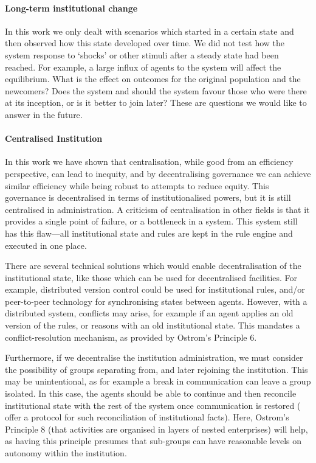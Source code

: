 \paragraph{Long-term institutional change} In this work we only dealt with
scenarios which started in a certain state and then observed how this state
developed over time. We did not test how the system response to `shocks' or
other stimuli after a steady state had been reached. For example, a large
influx of agents to the system will affect the equilibrium. What is the effect
on outcomes for the original population and the newcomers? Does the system and
should the system favour those who were there at its inception, or is it
better to join later? These are questions we would like to answer in the future.

\paragraph{Centralised Institution} In this work we have shown that
centralisation, while good from an efficiency perspective, can lead to
inequity, and by decentralising governance we can achieve similar efficiency
while being robust to attempts to reduce equity. This governance is
decentralised in terms of institutionalised powers, but it is still centralised in
administration. A criticism of centralisation in other fields is that it
provides a single point of failure, or a bottleneck in a system. This system
still has this flaw---all institutional state and rules are kept in the rule
engine and executed in one place.

There are several technical solutions which would enable decentralisation of
the institutional state, like those which can be used for decentralised
facilities. For example, distributed version control could be used for
institutional rules, and/or peer-to-peer technology for synchronising states
between agents. However, with a distributed system, conflicts may arise, for
example if an agent applies an old version of the rules, or reasons with an
old institutional state. This mandates a conflict-resolution mechanism, as
provided by Ostrom's Principle 6.

Furthermore, if we decentralise the institution administration, we must
consider the possibility of groups separating from, and later rejoining the
institution. This may be unintentional, as for example a break in communication
can leave a group isolated. In this case, the agents should be able to continue
and then reconcile institutional state with the rest of the system once
communication is restored (\citet{Sanderson2012} offer a protocol for such
reconciliation of institutional facts). Here, Ostrom's Principle 8 (that
activities are organised in layers of nested enterprises) will help, as having
this principle presumes that sub-groups can have reasonable levels on autonomy
within the institution.

